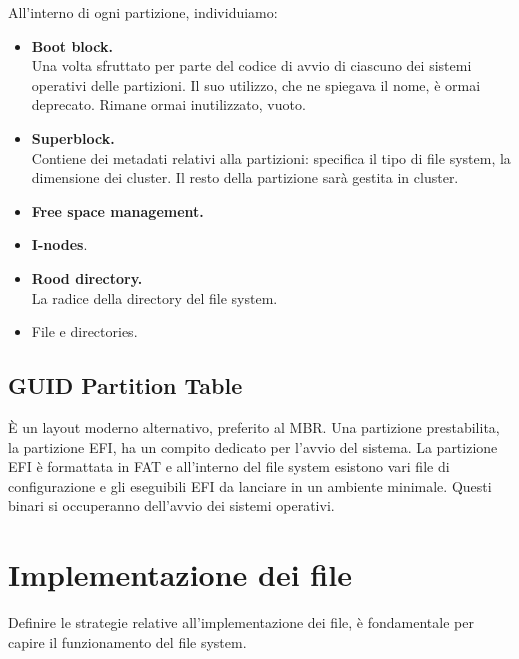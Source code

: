 \documentclass{report}
\begin{document}
All'interno di ogni partizione, individuiamo:
\begin{itemize}
    \item \textbf{Boot block.}\\
    Una volta sfruttato per parte del codice di avvio di ciascuno dei sistemi operativi delle partizioni. Il suo utilizzo, che ne spiegava il nome, è ormai deprecato. Rimane ormai inutilizzato, vuoto.
    \item \textbf{Superblock.}\\
    Contiene dei metadati relativi alla partizioni: specifica il tipo di file system, la dimensione dei cluster. Il resto della partizione sarà gestita in cluster.
    \item \textbf{Free space management.}
    \item \textbf{I-nodes}.
    \item \textbf{Rood directory.}\\
    La radice della directory del file system.
    \item File e directories.
\end{itemize}

\subsection{GUID Partition Table}
È un layout moderno alternativo, preferito al MBR. Una partizione prestabilita, la partizione EFI, ha un compito dedicato per l'avvio del sistema. La partizione EFI è formattata in FAT e all'interno del file system esistono vari file di configurazione e gli eseguibili EFI da lanciare in un ambiente minimale. Questi binari si occuperanno dell'avvio dei sistemi operativi.

\newpage
\section{Implementazione dei file}
Definire le strategie relative all'implementazione dei file, è fondamentale per capire il funzionamento del file system.
\end{document}
